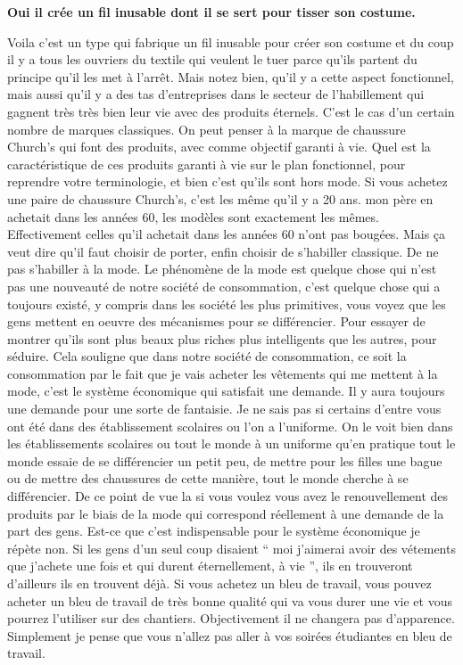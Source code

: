 \begin{small}
\smallbreak\textbf{Oui il crée un fil inusable dont il se sert pour tisser son costume.
}\smallbreak


Voila c'est un type qui fabrique un fil inusable pour créer son costume et du coup il y a tous les ouvriers du textile qui veulent le tuer parce qu'ils partent du principe qu'il les met à l'arrêt. Mais notez bien, qu'il y a cette aspect fonctionnel, mais aussi qu'il y a des tas d'entreprises dans le secteur de l'habillement qui gagnent très très bien leur vie avec des produits éternels. C'est le cas d'un certain nombre de marques classiques. On peut penser à la marque de chaussure Church's qui font des produits, avec comme objectif garanti à vie. Quel est la caractéristique de ces produits garanti à vie sur le plan fonctionnel, pour reprendre votre terminologie, et bien c'est qu'ils sont hors mode. Si vous achetez une paire de chaussure Church's, c'est les même qu'il y a 20 ans. mon père en achetait dans les années 60, les modèles sont exactement les mêmes. Effectivement celles qu'il achetait dans les années 60 n'ont pas bougées. Mais ça veut dire qu'il faut choisir de porter, enfin choisir de s'habiller classique. De ne pas s'habiller à la mode. Le phénomène de la mode est quelque chose qui n'est pas une nouveauté de notre société de consommation, c'est quelque chose qui a toujours existé, y compris dans les société les plus primitives, vous voyez que les gens mettent en oeuvre des mécanismes pour se différencier. Pour essayer de montrer qu'ils sont plus beaux plus riches plus intelligents que les autres, pour séduire. Cela souligne que dans notre société de consommation, ce soit la consommation par le fait que je vais acheter les vêtements qui me mettent à la mode, c'est le système économique qui satisfait une demande. Il y aura toujours une demande pour une sorte de fantaisie. Je ne sais pas si certains d'entre vous ont été dans des établissement scolaires ou l'on a l'uniforme. On le voit bien dans les établissements scolaires ou tout le monde à un uniforme qu'en pratique tout le monde essaie de se différencier un petit peu, de mettre pour les filles une bague ou de mettre des chaussures de cette manière, tout le monde cherche à se différencier. De ce point de vue la si vous voulez vous avez le renouvellement des produits par le biais de la mode qui correspond réellement à une demande de la part des gens. Est-ce que c'est indispensable pour le système économique je répète non. Si les gens d'un seul coup disaient “ moi j'aimerai avoir des vétements que j'achete une fois et qui durent éternellement, à vie ”, ils en trouveront d'ailleurs ils en trouvent déjà. Si vous achetez un bleu de travail, vous pouvez acheter un bleu de travail de très bonne qualité qui va vous durer une vie et vous pourrez l'utiliser sur des chantiers. Objectivement il ne changera pas d'apparence. Simplement je pense que vous n'allez pas aller à vos soirées étudiantes en bleu de travail.


\end{small}
